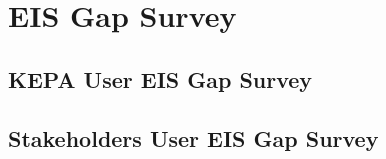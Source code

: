 \chapter{EIS Gap Survey}

\section{KEPA User EIS Gap Survey}



\section{Stakeholders User EIS Gap Survey}
